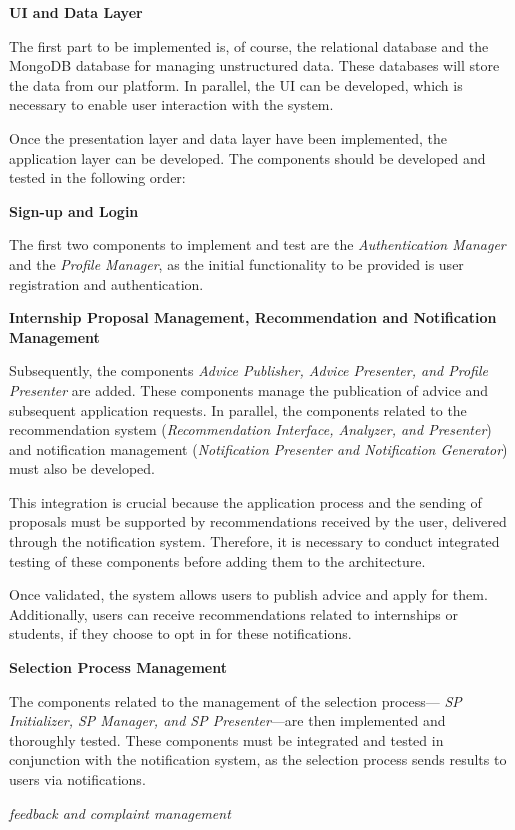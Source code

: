 \textbf{UI and Data Layer} 

The first part to be implemented is, of course, the relational database and the MongoDB database for managing unstructured data. These databases will store the data from our platform. In parallel, the UI can be developed, which is necessary to enable user interaction with the system.

Once the presentation layer and data layer have been implemented, the application layer can be developed. The components should be developed and tested in the following order:

\textbf{Sign-up and Login} 

The first two components to implement and test are the \textit{Authentication Manager} and the \textit{Profile Manager}, as the initial functionality to be provided is user registration and authentication.

\textbf{Internship Proposal Management, Recommendation and Notification Management}

Subsequently, the components \textit{Advice Publisher, Advice Presenter, and Profile Presenter} are added. These components manage the publication of advice and subsequent application requests. In parallel, the components related to the recommendation system (\textit{Recommendation Interface, Analyzer, and Presenter}) and notification management (\textit{Notification Presenter and Notification Generator}) must also be developed.

This integration is crucial because the application process and the sending of proposals must be supported by recommendations received by the user, delivered through the notification system. Therefore, it is necessary to conduct integrated testing of these components before adding them to the architecture.

Once validated, the system allows users to publish advice and apply for them. Additionally, users can receive recommendations related to internships or students, if they choose to opt in for these notifications.


\textbf{Selection Process Management}

The components related to the management of the selection process— \textit{SP Initializer, SP Manager, and SP Presenter}—are then implemented and thoroughly tested. These components must be integrated and tested in conjunction with the notification system, as the selection process sends results to users via notifications.


\textit{feedback and complaint management}

